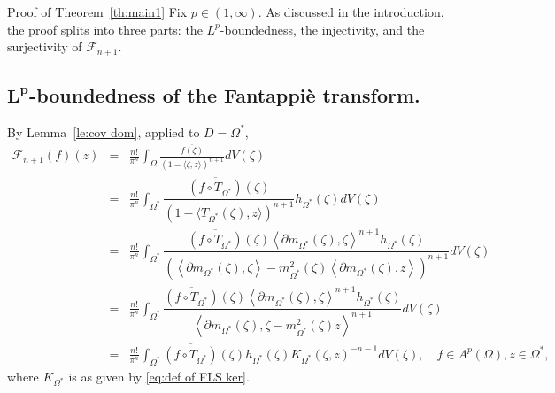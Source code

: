 \documentclass[11pt, oneside, reqno]{amsart}
\numberwithin{equation}{section}
\theoremstyle{definition}
\newcommand{\beas}{\begin{eqnarray*}}
\newcommand{\eeas}{\end{eqnarray*}}
\newcommand{\hol}{\mathcal {O}}
\newcommand{\ltt}{\left(}
\newcommand{\rtt}{\right)}
\newcommand{\Om}{\Omega}
\begin{document}
{\begin{section}{Proof of Theorem~\ref{th:main1}}
Fix $p\in(1,\infty)$. As discussed in the introduction, the proof splits into three parts: the $L^p$-boundedness, the injectivity, and the surjectivity of $\mathcal F_{n+1}$. 

\subsection{$\mathbf{L^p}$-boundedness of the Fantappi{\`e} transform.}
By Lemma~\ref{le:cov dom}, applied to $D=\Om^*$, 
{
\beas
\mathcal F_{n+1}\ltt f\rtt(z)&=&\frac{n!}{\pi^n}\int_{\Om} \frac{\overline{ f(\zeta)}}{\ltt 1-\langle \zeta,z\rangle\rtt^{n+1}}dV(\zeta)\\
&=& \frac{n!}{\pi^n}\int_{\Om^*} \dfrac{\overline{\ltt f\circ T_{\Om^*}\rtt}(\zeta)}{\ltt 1-\langle T_{\Om^*}(\zeta),z\rangle\rtt^{n+1}} h_{\Om^*}(\zeta) dV(\zeta) \\
&=&
\frac{n!} {\pi^n}\int_{\Om^*}\dfrac{\overline{\ltt f\circ T_{\Om^*}\rtt}(\zeta)\left\langle \partial m_{\Om^*}(\zeta),\zeta\right\rangle^{n+1} h_{\Om^*}(\zeta)}{\ltt\left\langle \partial m_{\Om^*}(\zeta),\zeta\right\rangle-m_{\Om^*}^2(\zeta)\left\langle \partial m_{\Om^*}(\zeta),z\right\rangle\rtt^{n+1}} dV(\zeta)\\
&=&\frac{n!} {\pi^n}\int_{\Om^*}\dfrac{\overline{\ltt f\circ T_{\Om^*}\rtt}(\zeta)\left\langle \partial m_{\Om^*}(\zeta),\zeta\right\rangle^{n+1} h_{\Om^*}(\zeta)}{\left\langle \partial m_{\Om^*}(\zeta),\zeta-m_{\Om^*}^2(\zeta)z\right\rangle^{n+1}} dV(\zeta)\\
&=& \frac{n!}{\pi^n}\int_{\Om^*} \overline{\ltt f\circ T_{\Om^*}\rtt}(\zeta) h_{\Om^*}(\zeta) K_{\Om^*}\ltt \zeta,z\rtt^{-n-1} dV(\zeta),
\quad f\in A^p\ltt\Om\rtt, z\in\Om^*,
\eeas
}
where $K_{\Om^*}$ is as given by \eqref{eq:def of FLS ker}.


\end{section}}
\end{document}
